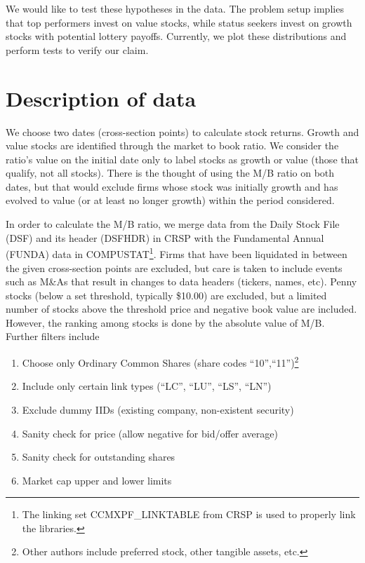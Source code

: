 \documentclass[12pt]{article}
\numberwithin{equation}{section}
\begin{document}
We would like to test these hypotheses in the data. The problem
setup implies that top performers invest on value stocks, while
status seekers invest on growth stocks with potential lottery
payoffs. Currently, we plot these distributions and perform tests to
verify our claim.

\section{Description of data}

\indent\par We choose two dates (cross-section points) to calculate
stock returns. Growth and value stocks are identified through the
market to book ratio. We consider the ratio's value on the initial
date only to label stocks as growth or value (those that qualify,
not all stocks). There is the thought of using the M/B ratio on both
dates, but that would exclude firms whose stock was initially growth
and has evolved to value (or at least no longer growth) within the
period considered.

In order to calculate the M/B ratio, we merge data from the Daily
Stock File (DSF) and its header (DSFHDR) in CRSP with the
Fundamental Annual (FUNDA) data in COMPUSTAT\footnote{The linking
set CCMXPF\_LINKTABLE from CRSP is used to properly link the
libraries.}. Firms that have been liquidated in between the given
cross-section points are excluded, but care is taken to include
events such as M\&As that result in changes to data headers
(tickers, names, etc). Penny stocks (below a set threshold,
typically \$10.00) are excluded, but a limited number of stocks
above the threshold price and negative book value are included.
However, the ranking among stocks is done by the absolute value of
M/B. Further filters include
\begin{enumerate}
\item Choose only Ordinary Common Shares (share codes
``10'',``11'')\footnote{Other authors include preferred stock, other
tangible assets, etc.}
\item Include only certain link types (``LC'', ``LU'', ``LS'', ``LN'')
\item Exclude dummy IIDs (existing company, non-existent security)
\item Sanity check for price (allow negative for bid/offer average)
\item Sanity check for outstanding shares
\item Market cap upper and lower limits
\end{enumerate}
\end{document}
